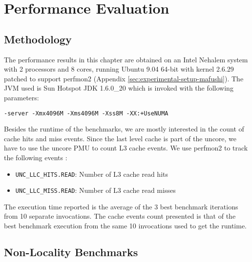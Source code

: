 
\chapter{Performance Evaluation}
\label{chap:locality-performance}

\section{Methodology}
\label{sec:locality-performance-methodology}

The performance results in this chapter are obtained on an Intel
Nehalem system with 2 processors and 8 cores, running Ubuntu 9.04
64-bit with kernel 2.6.29 patched to support perfmon2
\cite{Eranian2008} (Appendix
\ref{sec:experimental-setup-mafushi}). The JVM used is Sun Hotspot JDK
1.6.0\_20 which is invoked with the following parameters:

\begin{lstlisting}[style=Listing]
  -server -Xmx4096M -Xms4096M -Xss8M -XX:+UseNUMA
\end{lstlisting}

Besides the runtime of the benchmarks, we are mostly interested in the
count of cache hits and miss events. Since the last level cache is
part of the uncore, we have to use the uncore PMU to count L3 cache
events. We use perfmon2 to track the following events
\cite{Levinthal2009}:

\begin{itemize}
\item \lstinline!UNC_LLC_HITS.READ!: Number of L3 cache read hits
\item \lstinline!UNC_LLC_MISS.READ!: Number of L3 cache read misses
\end{itemize}

The execution time reported is the average of the 3 best benchmark
iterations from 10 separate invocations. The cache events count
presented is that of the best benchmark execution from the same 10
invocations used to get the runtime.


\section{Non-Locality Benchmarks}
\label{sec:locality-performance-non-locality}

